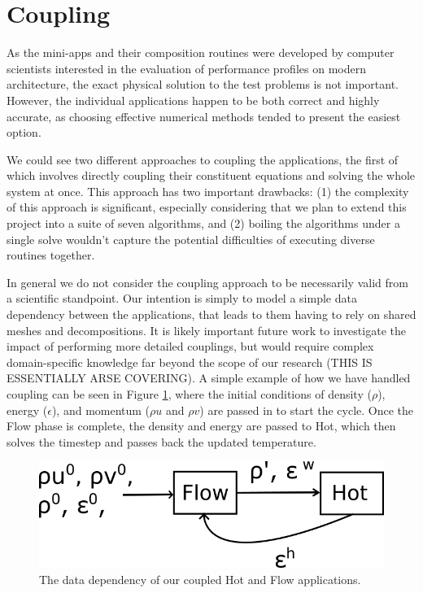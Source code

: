 \documentclass[runningheads,a4paper]{llncs}
\begin{document}
\section{Coupling}

As the mini-apps and their composition routines were developed by computer scientists interested in the evaluation of performance profiles on modern architecture, the exact physical solution to the test problems is not important. However, the individual applications happen to be both correct and highly accurate, as choosing effective numerical methods tended to present the easiest option. 

We could see two different approaches to coupling the applications, the first of which involves directly coupling their constituent equations and solving the whole system at once. This approach has two important drawbacks: (1) the complexity of this approach is significant, especially considering that we plan to extend this project into a suite of seven algorithms, and (2) boiling the algorithms under a single solve wouldn't capture the potential difficulties of executing diverse routines together.


In general we do not consider the coupling approach to be necessarily valid from a scientific standpoint. Our intention is simply to model a simple data dependency between the applications, that leads to them having to rely on shared meshes and decompositions. It is likely important future work to investigate the impact of performing more detailed couplings, but would require complex domain-specific knowledge far beyond the scope of our research (THIS IS ESSENTIALLY ARSE COVERING). A simple example of how we have handled coupling can be seen in Figure \ref{fig:hot-flow-flow}, where the initial conditions of density ($\rho$), energy ($\epsilon$), and momentum ($\rho u$ and $\rho v$) are passed in to start the cycle. Once the Flow phase is complete, the density and energy are passed to Hot, which then solves the timestep and passes back the updated temperature.

\begin{figure}
  \centering
  \includegraphics[width=0.6\linewidth]{hot-flow-flow}
  \caption{The data dependency of our coupled Hot and Flow applications.}
  \label{fig:hot-flow-flow}
\end{figure}
\end{document}
